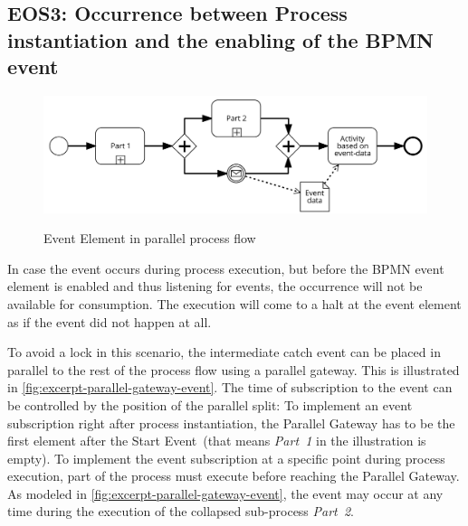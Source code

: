 \subsection*{EOS3: Occurrence between Process instantiation and the enabling of the BPMN event}
\begin{figure}[]
	\myfloatalign
	{\includegraphics[width=1\linewidth]{chapters/assessment/parallel-gateway-early-subscription.png}}
	\caption{Event Element in parallel process flow}\label{fig:excerpt-parallel-gateway-event}
\end{figure}

In case the event occurs during process execution, but before the BPMN event element is enabled and thus listening for events, the occurrence will not be available for consumption. 
The execution will come to a halt at the event element as if the event did not happen at all.

To avoid a lock in this scenario, the intermediate catch event can be placed in parallel to the rest of the process flow using a parallel gateway. 
This is illustrated in \autoref{fig:excerpt-parallel-gateway-event}. The time of subscription to the event can be controlled by the position of the parallel split: To implement an event subscription right after process instantiation, the Parallel Gateway has to be the first element after the Start Event~(that means \textit{Part~1} in the illustration is empty). 
To implement the event subscription at a specific point during process execution, part of the process must execute before reaching the Parallel Gateway. As modeled in \autoref{fig:excerpt-parallel-gateway-event}, the event may occur at any time during the execution of the collapsed sub-process \textit{Part~2}. 


